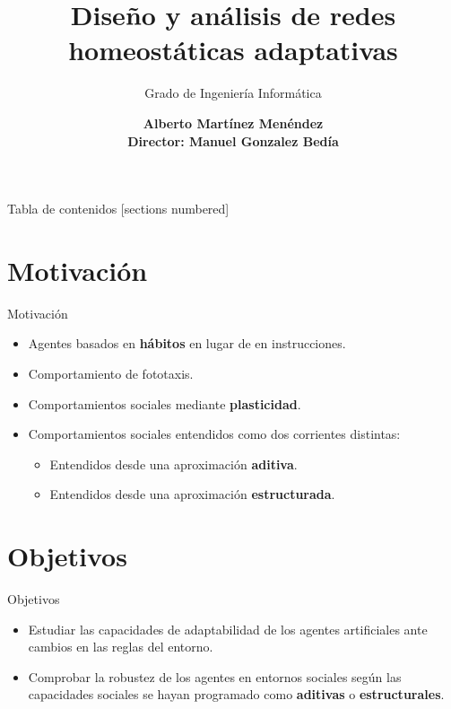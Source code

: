 \documentclass[aspectratio=169]{beamer}
\title{Diseño y análisis de redes homeostáticas adaptativas}
\subtitle{Grado de Ingeniería Informática}
\date{}
\author[Alberto Martínez Menéndez]{\textbf {Alberto Martínez Menéndez\\ \footnotesize Director: Manuel Gonzalez Bedía}}
\institute{Escuela de Ingeniería y Arquitectura}
\begin{document}
\maketitle

\begin{frame}{Tabla de contenidos}
  [sections numbered]
  \tableofcontents[hideallsubsections]
\end{frame}

\section{Motivación}
\begin{frame}{Motivación}
\begin{itemize}
  \item {Agentes basados en \textbf{hábitos} en lugar de en instrucciones.}
  \item {Comportamiento de fototaxis.}
  \item {Comportamientos sociales mediante \textbf{plasticidad}.}
  \item {Comportamientos sociales entendidos como dos corrientes distintas:}
  \begin{itemize}
    \item {Entendidos desde una aproximación \textbf{aditiva}.}
    \item {Entendidos desde una aproximación \textbf{estructurada}.}
  \end{itemize}
\end{itemize}
\end{frame}

\section{Objetivos}
\begin{frame}{Objetivos}
  \begin{itemize}
  \item {Estudiar las capacidades de adaptabilidad de los agentes artificiales ante cambios en las reglas del entorno.}
  \item {Comprobar la robustez de los agentes en entornos sociales según las capacidades sociales se hayan programado como \textbf{aditivas} o \textbf{estructurales}.}
  \end{itemize}
\end{frame}
\end{document}
